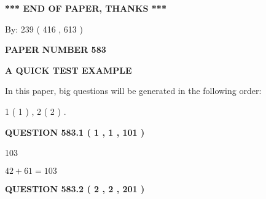 \documentclass[12pt]{article}
\begin{document}
   
   
   
   
\vspace{1.0in} 
{\textbf{\large{ *** END OF PAPER, THANKS *** }}} 
   
   
\hspace{1.0in} By: 
 239 ( 416 ,  613 )
   
   
   
   
\newpage 
\setcounter{page}{ 
   583001 } 
   
   
   
   
 {\textbf{ \Large{ PAPER NUMBER  583  }}}
   
   
\vspace{0.2in}
   
   
   
   
   
   
 \vspace{0.2in}
{\LARGE {\textbf{ A QUICK TEST EXAMPLE}}}
   
   
   
\vspace{0.2in}
   
In this paper, big questions will be generated in the following order: 
   
   
   1 ( 1 )
 ,
   2 ( 2 )
 .
  
\vspace{0.2in}
  
{\textbf{\Large{QUESTION
583.1 
 ( 1 , 1 , 101 )
}}}
  
  
 
 
\noindent{}

103
 
 
 
 
\noindent{}

$ %
42 +  %
61=   %
103$
 
 
  
\vspace{0.2in}
  
{\textbf{\Large{QUESTION
583.2 
 ( 2 , 2 , 201 )
}}}
  
  
 
 
\noindent{}
 
\end{document}
